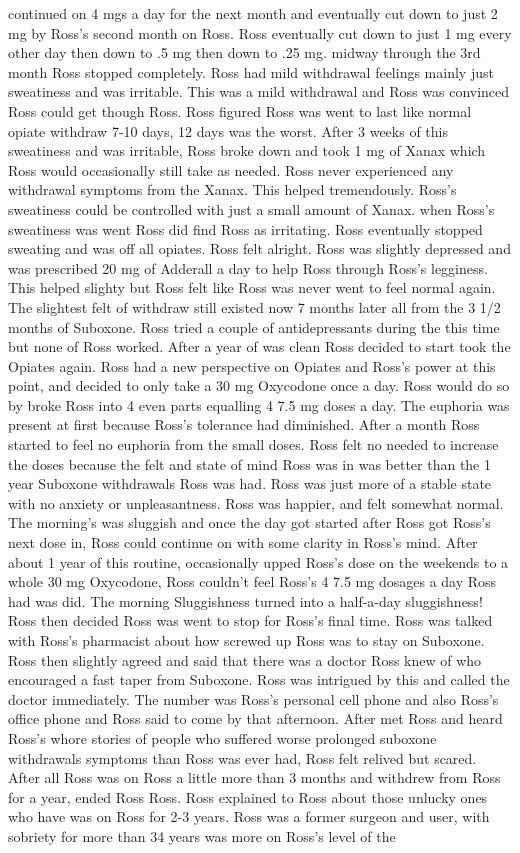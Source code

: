 \documentclass[12pt]{book}
\begin{document}
continued on 4 mgs a day for the next month and eventually cut down to just 2 mg by Ross's second month on Ross. Ross eventually cut down to just 1 mg every other day then down to .5 mg then down to .25 mg. midway through the 3rd month Ross stopped completely. Ross had mild withdrawal feelings mainly just sweatiness and was irritable. This was a mild withdrawal and Ross was convinced Ross could get though Ross. Ross figured Ross was went to last like normal opiate withdraw 7-10 days, 12 days was the worst. After 3 weeks of this sweatiness and was irritable, Ross broke down and took 1 mg of Xanax which Ross would occasionally still take as needed. Ross never experienced any withdrawal symptoms from the Xanax. This helped tremendously. Ross's sweatiness could be controlled with just a small amount of Xanax. when Ross's sweatiness was went Ross did find Ross as irritating. Ross eventually stopped sweating and was off all opiates. Ross felt alright. Ross was slightly depressed and was prescribed 20 mg of Adderall a day to help Ross through Ross's legginess. This helped slighty but Ross felt like Ross was never went to feel normal again. The slightest felt of withdraw still existed now 7 months later all from the 3 1/2 months of Suboxone. Ross tried a couple of antidepressants during the this time but none of Ross worked. After a year of was clean Ross decided to start took the Opiates again. Ross had a new perspective on Opiates and Ross's power at this point, and decided to only take a 30 mg Oxycodone once a day. Ross would do so by broke Ross into 4 even parts equalling 4  7.5 mg doses a day. The euphoria was present at first because Ross's tolerance had diminished. After a month Ross started to feel no euphoria from the small doses. Ross felt no needed to increase the doses because the felt and state of mind Ross was in was better than the 1 year Suboxone withdrawals Ross was had. Ross was just more of a stable state with no anxiety or unpleasantness. Ross was happier, and felt somewhat normal. The morning's was sluggish and once the day got started after Ross got Ross's next dose in, Ross could continue on with some clarity in Ross's mind. After about 1 year of this routine, occasionally upped Ross's dose on the weekends to a whole 30 mg Oxycodone, Ross couldn't feel Ross's 4  7.5 mg dosages a day Ross had was did. The morning Sluggishness turned into a half-a-day sluggishness! Ross then decided Ross was went to stop for Ross's final time. Ross was talked with Ross's pharmacist about how screwed up Ross was to stay on Suboxone. Ross then slightly agreed and said that there was a doctor Ross knew of who encouraged a fast taper from Suboxone. Ross was intrigued by this and called the doctor immediately. The number was Ross's personal cell phone and also Ross's office phone and Ross said to come by that afternoon. After met Ross and heard Ross's whore stories of people who suffered worse prolonged suboxone withdrawals symptoms than Ross was ever had, Ross felt relived but scared. After all Ross was on Ross a little more than 3 months and withdrew from Ross for a year, ended Ross Ross. Ross explained to Ross about those unlucky ones who have was on Ross for 2-3 years. Ross was a former surgeon and user, with sobriety for more than 34 years was more on Ross's level of the 
\end{document}
